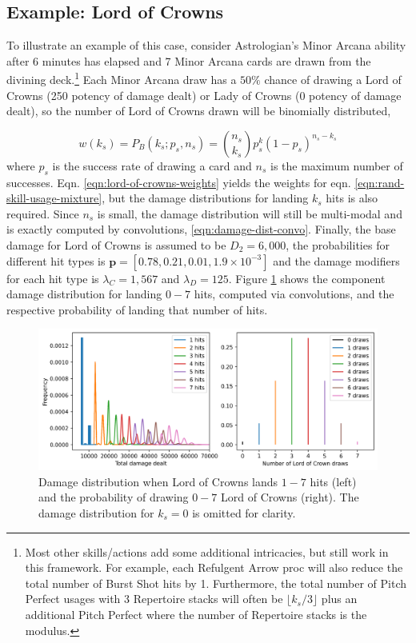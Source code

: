 \documentclass{article}
\begin{document}
    \subsection{Example: Lord of Crowns}
    To illustrate an example of this case, consider Astrologian's Minor Arcana ability after 6 minutes has elapsed and 7 Minor Arcana cards are drawn from the divining deck.\footnote{Most other skills/actions add some additional intricacies, but still work in this framework. For example, each Refulgent Arrow proc will also reduce the total number of Burst Shot hits by 1. Furthermore, the total number of Pitch Perfect usages with 3 Repertoire stacks will often be $\lfloor k_s / 3 \rfloor$ plus an additional Pitch Perfect where the number of Repertoire stacks is the modulus.} Each Minor Arcana draw has a $50\%$ chance of drawing a Lord of Crowns (250 potency of damage dealt) or Lady of Crowns (0 potency of damage dealt), so the number of Lord of Crowns drawn will be binomially distributed,
    
    \begin{equation}\label{eqn:lord-of-crowns-weights}
        w(k_s) = P_B(k_s; p_{s}, n_s) = \binom{n_s}{k_s} p_s^{k} (1-p_s)^{n_s-k_s}
    \end{equation}
    where $p_s$ is the success rate of drawing a card and $n_s$ is the maximum number of successes. Eqn. \ref{eqn:lord-of-crowns-weights} yields the weights for eqn. \ref{eqn:rand-skill-usage-mixture}, but the damage distributions for landing $k_s$ hits is also required. Since $n_s$ is small, the damage distribution will still be multi-modal and is exactly computed by convolutions, \ref{eqn:damage-dist-convo}. Finally, the base damage for Lord of Crowns is assumed to be $D_2 = 6,000$, the probabilities for different hit types is $\textbf{p} = [0.78, 0.21, 0.01, 1.9 \times 10^{-3}]$ and the damage modifiers for each hit type is $\lambda_C = 1,567$ and $\lambda_D = 125$. Figure \ref{fig:hit-enumeration} shows the component damage distribution for landing $0 - 7$ hits, computed via convolutions, and the respective probability of landing that number of hits.

    \begin{figure}[H]
        \centering
        \includegraphics[width=0.99\linewidth]{img/hit-enumeration.PNG}
        \caption{Damage distribution when Lord of Crowns lands $1 - 7$ hits (left) and the probability of drawing $0-7$ Lord of Crowns (right). The damage distribution for $k_s = 0$ is omitted for clarity.}\label{fig:hit-enumeration}
    \end{figure}
\end{document}
